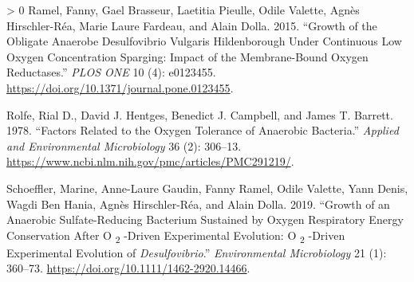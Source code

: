 \documentclass{article}
\newlength{\cslhangindent}
\newenvironment{CSLReferences}[3] %
 {%
  \setlength{\parindent}{0pt}
  \ifodd #1 \everypar{\setlength{\hangindent}{\cslhangindent}}\ignorespaces\fi
  \ifnum #2 > 0
  \setlength{\parskip}{#2\baselineskip}
  \fi
 }%
 {}
\begin{document}
\begin{CSLReferences}{1}{0}
\leavevmode\hypertarget{ref-ramel2015}{}%
Ramel, Fanny, Gael Brasseur, Laetitia Pieulle, Odile Valette, Agnès
Hirschler-Réa, Marie Laure Fardeau, and Alain Dolla. 2015. {``Growth of
the Obligate Anaerobe Desulfovibrio Vulgaris Hildenborough Under
Continuous Low Oxygen Concentration Sparging: Impact of the
Membrane-Bound Oxygen Reductases.''} \emph{PLOS ONE} 10 (4): e0123455.
\url{https://doi.org/10.1371/journal.pone.0123455}.

\leavevmode\hypertarget{ref-rolfe1978}{}%
Rolfe, Rial D., David J. Hentges, Benedict J. Campbell, and James T.
Barrett. 1978. {``Factors Related to the Oxygen Tolerance of Anaerobic
Bacteria.''} \emph{Applied and Environmental Microbiology} 36 (2):
306--13. \url{https://www.ncbi.nlm.nih.gov/pmc/articles/PMC291219/}.

\leavevmode\hypertarget{ref-schoeffler2019}{}%
Schoeffler, Marine, Anne-Laure Gaudin, Fanny Ramel, Odile Valette, Yann
Denis, Wagdi Ben Hania, Agnès Hirschler-Réa, and Alain Dolla. 2019.
{``Growth of an Anaerobic Sulfate-Reducing Bacterium Sustained by Oxygen
Respiratory Energy Conservation After O {\textsubscript{2}} -Driven
Experimental Evolution: O {\textsubscript{2}} -Driven Experimental
Evolution of {\emph{Desulfovibrio}}.''} \emph{Environmental
Microbiology} 21 (1): 360--73.
\url{https://doi.org/10.1111/1462-2920.14466}.

\end{CSLReferences}



\end{document}
